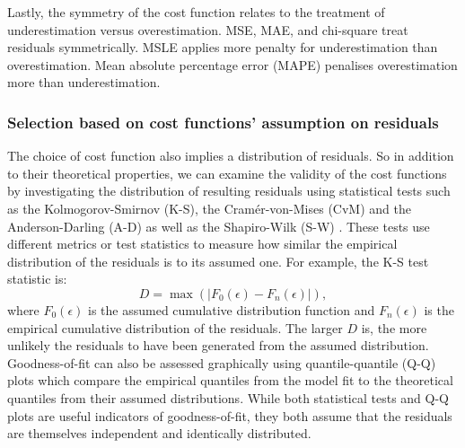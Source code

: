 \documentclass[a4paper,fleqn]{cas-sc}
\begin{document}
    Lastly, the symmetry of the cost function relates to the treatment of underestimation versus overestimation. MSE, MAE, and chi-square treat residuals symmetrically. MSLE applies more penalty for underestimation than overestimation. Mean absolute percentage error (MAPE) penalises overestimation more than underestimation. 


\subsubsection{Selection based on cost functions' assumption on residuals} \label{subsection-met-fits}

    The choice of cost function also implies a distribution of residuals. So in addition to their theoretical properties, we can examine the validity of the cost functions by investigating the distribution of resulting residuals using statistical tests such as the Kolmogorov-Smirnov (K-S), the Cram{\'e}r-von-Mises (CvM) and the Anderson-Darling (A-D) as well as the Shapiro-Wilk (S-W) \citep{Kandethody2015, Stephen1986}. These tests use different metrics or test statistics to measure how similar the empirical distribution of the residuals is to its assumed one. For example, the K-S test statistic is:
    \begin{equation}
        D = \max(|F_{0}(\epsilon) - F_{n}(\epsilon)|),
    \end{equation}
    where $F_{0}(\epsilon)$ is the assumed cumulative distribution function and $F_{n}(\epsilon)$ is the empirical cumulative distribution of the residuals. The larger $D$ is, the more unlikely the residuals to have been generated from the assumed distribution. Goodness-of-fit can also be assessed graphically using quantile-quantile (Q-Q) plots which compare the empirical quantiles from the model fit to the theoretical quantiles from their assumed distributions. While both statistical tests and Q-Q plots are useful indicators of goodness-of-fit, they both assume that the residuals are themselves independent and identically distributed. 
\end{document}
